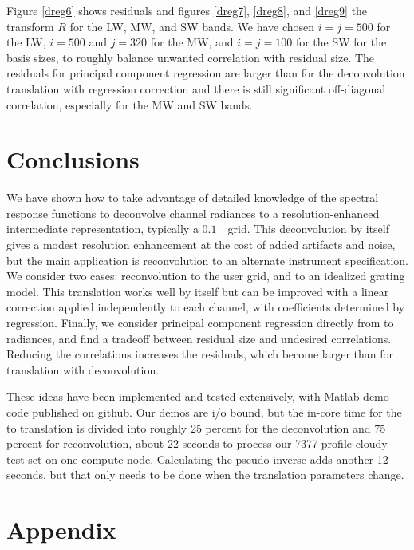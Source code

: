 \documentclass[10pt,twocolumn]{article}
\begin{document}
Figure \ref{dreg6} shows residuals and figures \ref{dreg7},
\ref{dreg8}, and \ref{dreg9} the transform $R$ for the {\cris} LW,
MW, and SW bands.  We have chosen $i = j = 500$ for the LW, $i =
500$ and $j = 320$ for the MW, and $i = j = 100$ for the SW for the
basis sizes, to roughly balance unwanted correlation with residual
size.  The residuals for principal component regression are larger
than for the deconvolution translation with regression correction
and there is still significant off-diagonal correlation, especially
for the MW and SW bands.

\section{Conclusions}
\label{appcon}

We have shown how to take advantage of detailed knowledge of the
{\airs} spectral response functions to deconvolve channel radiances
to a resolution-enhanced intermediate representation, typically a
$0.1$~\wn\ grid.  This deconvolution by itself gives a modest
resolution enhancement at the cost of added artifacts and noise, but
the main application is reconvolution to an alternate instrument
specification.  We consider two cases: reconvolution to the {\cris}
user grid, and to an idealized grating model.  This translation
works well by itself but can be improved with a linear correction
applied independently to each channel, with coefficients determined
by regression.  Finally, we consider principal component regression
directly from {\airs} to {\cris} radiances, and find a tradeoff
between residual size and undesired correlations.  Reducing the
correlations increases the residuals, which become larger than for
translation with deconvolution.

These ideas have been implemented and tested extensively, with
Matlab demo code published on github.  Our demos are i/o bound, but
the in-core time for the {\airs} to {\cris} translation is divided
into roughly 25 percent for the deconvolution and 75 percent for
reconvolution, about 22 seconds to process our 7377 profile cloudy
test set on one compute node.  Calculating the pseudo-inverse adds
another 12 seconds, but that only needs to be done when the
translation parameters change.

\section{Appendix}
\label{append}
\end{document}
